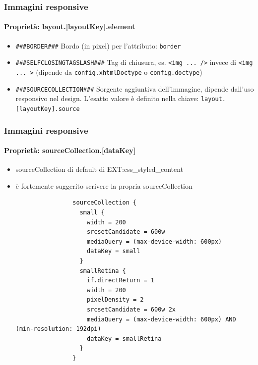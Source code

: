 \begin{frame}[fragile]
	\frametitle{Immagini responsive}
	\framesubtitle{Proprietà: layout.[layoutKey].element}

		\begin{itemize}
			\item \lstinline!###BORDER###!\newline
				Bordo (in pixel) per l'attributo: \texttt{border}

			\item \lstinline!###SELFCLOSINGTAGSLASH###!\newline
				Tag di chiusura, es. \texttt{<img ... />} invece di \texttt{<img ... >}\newline
				(dipende da \texttt{config.xhtmlDoctype} o \texttt{config.doctype})

			\item \lstinline!###SOURCECOLLECTION###!\newline
				Sorgente aggiuntiva dell'immagine, dipende dall'uso responsivo nel design.
				L'esatto valore è definito nella chiave: \texttt{layout.[layoutKey].source}

	\end{itemize}

\end{frame}


\begin{frame}[fragile]
	\frametitle{Immagini responsive}
	\framesubtitle{Proprietà: sourceCollection.[dataKey]}

	\begin{itemize}
		\item sourceCollection di default di EXT:css\_styled\_content
		\item è fortemente suggerito scrivere la propria sourceCollection

			\lstset{
				basicstyle=\tiny\ttfamily
			}

			\begin{lstlisting}
				sourceCollection {
				  small {
				    width = 200
				    srcsetCandidate = 600w
				    mediaQuery = (max-device-width: 600px)
				    dataKey = small
				  }
				  smallRetina {
				    if.directReturn = 1
				    width = 200
				    pixelDensity = 2
				    srcsetCandidate = 600w 2x
				    mediaQuery = (max-device-width: 600px) AND (min-resolution: 192dpi)
				    dataKey = smallRetina
				  }
				}
			\end{lstlisting}
	\end{itemize}

\end{frame}

